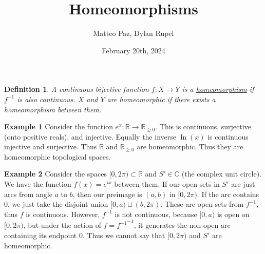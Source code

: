 \documentclass{article}
\author{Matteo Paz, Dylan Rupel}
\date{February 20th, 2024}
\title{Homeomorphisms}
\newcommand{\RR}{\mathbb{R}}
\newtheorem{definition}{Definition}
\begin{document}
\maketitle{}

\begin{definition}
A continuous bijective function $f: X \to Y$ is a \underline{homeomorphism} if $f^{-1}$ is also
continuous. $X$ and $Y$ are homeomorphic if there exists a homeomorphism between them.
\end{definition}

\textbf{Example 1}
Consider the function $e^x: \RR \to \RR_{\geq 0}$. This is continuous, surjective (onto positive reals), and 
injective. Equally the inverse $\ln(x)$ is continuous injective and surjective. Thus $\RR$ and $\RR_{\geq 0}$ 
are homeomorphic. Thus they are homeomorphic topological spaces.
\vspace{1em}

\textbf{Example 2} Consider the spaces $[0, 2\pi) \subset \RR$ and $S' \in \mathbb{C}$ (the complex unit circle).
We have the function $f(x) = e^{ix}$ between them. If our open sets in $S'$ are just arcs from angle $a$ to $b$, then
our preimage is $(a,b)$ in $[0, 2\pi)$. If the arc contains $0$, we just take the disjoint union $[0,a) \sqcup (b, 2\pi)$.
These are open sets from $f^{-1}$, thus $f$ is continuous. However, $f^{-1}$ is not continuous, because $[0, a)$ is open on
$[0, 2\pi)$, but under the action of $f = {f^{-1}}^{-1}$, it generates the non-open arc containing its endpoint $0$. Thus we 
cannot say that $[0, 2\pi)$ and $S'$ are homeomorphic.
\end{document}
